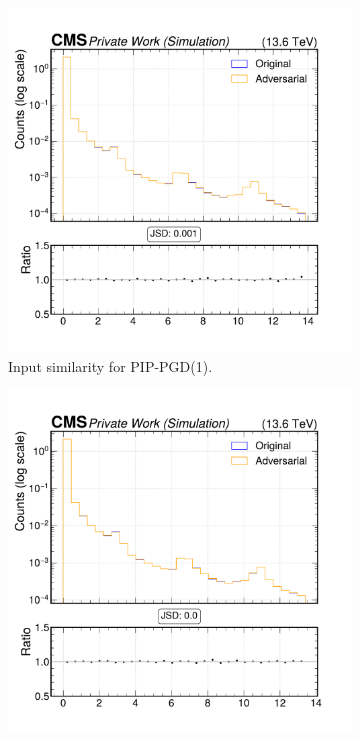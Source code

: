 \begin{figure}[h]
  \centering
  \begin{subfigure}[t]{0.32\textwidth}
    \includegraphics[width=\linewidth]{media/output/features/compare/combined_it_1/cmp_vtx_arr_sv_dxy.pdf}
    \caption*{Input similarity for PIP-PGD(1).}
  \end{subfigure}\hfill
  \begin{subfigure}[t]{0.32\textwidth}
    \includegraphics[width=\linewidth]{media/output/features/compare/combined_it_2/cmp_vtx_arr_sv_dxy.pdf}

\end{subfigure}
\end{figure}
